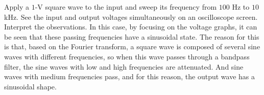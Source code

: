\documentclass[11pt]{article}
\begin{document}
\begin{question}
\begin{subquestion}{Apply a $1$-V square wave to the input and sweep its frequency from $100$ Hz to $10$ kHz. See the input and output voltages simultaneously on an oscilloscope screen. Interpret the observations.}
{            In this case, by focusing on the voltage graphs, it can be seen that these passing frequencies have a sinusoidal state. The reason for this is that, based on the Fourier transform, a square wave is composed of several sine waves with different frequencies, so when this wave passes through a bandpass filter, the sine waves with low and high frequencies are attenuated. And sine waves with medium frequencies pass, and for this reason, the output wave has a sinusoidal shape.
        }
    \end{subquestion}

\end{question}



\end{document}
